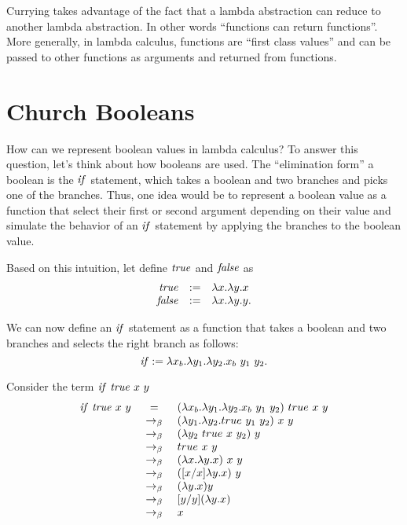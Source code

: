 \begin{note}
Currying takes advantage of the fact that a lambda abstraction can reduce to another lambda abstraction.
%
In other words ``functions can return functions''. 
%
More generally, in lambda calculus, functions are ``first class values'' and can be passed to other functions as arguments and returned from functions.
%
\end{note}

\section{Church Booleans}
\label{sec:lcc:bools}

How can we represent boolean values in lambda calculus?  
%
To answer this question, let's think about how booleans are
used.  
%
The ``elimination form'' a boolean is the $\mathit{if}$ statement, which
takes a boolean and two branches and picks one of the branches.  
%
Thus, one idea would be to represent a boolean value as a function that select their first or second argument depending on their value and  simulate the behavior of an $\mathit{if}$ statement by applying the branches to the boolean
value.

\begin{gram}
Based on this intuition, let define $\mathit{true}$ and $\mathit{false}$ as
\[
\begin{array}{rcl}
\mathit{true} & := & \lambda x. \lambda y.  x
\\
\mathit{false} & := & \lambda x. \lambda y. y.
\end{array}
\]

We can now define an $\mathit{if}$ statement as a function that takes a
boolean and two branches and selects the right branch as follows:
\[
\mathit{if} := \lambda x_b. \lambda y_1. \lambda y_2. x_b~ y_1~ y_2.
\]
\end{gram}

\begin{example}
 Consider the term $\mathit{if}~\mathit{true}~ x~ y$
\[
\begin{array}{rcl}
\mathit{if}~ \mathit{true}~ x~ y & =     & (\lambda x_b. \lambda y_1. \lambda y_2. x_b~ y_1~ y_2)~ true~ x~ y \\
              & ~\rightarrow_{\beta}~ &  (\lambda y_1. \lambda y_2. true~ y_1~ y_2)~ x~ y \\
              & ~\rightarrow_{\beta}~ & (\lambda y_2~ true~ x~ y_2)~ y \\
              & ~\rightarrow_{\beta}~ & true~ x~ y \\
              & ~\rightarrow_{\beta}~ & (\lambda x. \lambda y. x)~ x~ y \\
              & ~\rightarrow_{\beta}~ & ([x/x] \lambda y. x)~  y\\
              & ~\rightarrow_{\beta}~ & (\lambda y. x) y \\
              & ~\rightarrow_{\beta}~ & [y/y](\lambda y. x) \\
              & ~\rightarrow_{\beta}~ & x\\
\end{array}
\]
\end{example}



